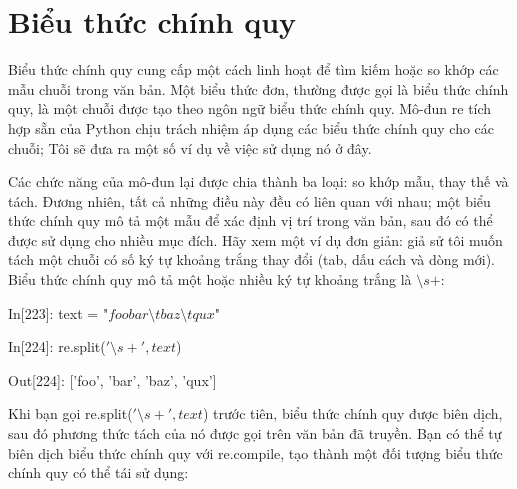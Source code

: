 \section{Biểu thức chính quy}
Biểu thức chính quy cung cấp một cách linh hoạt để tìm kiếm hoặc so khớp các mẫu chuỗi trong văn bản. Một biểu thức đơn, thường được gọi là biểu thức chính quy, là một chuỗi được tạo theo ngôn ngữ biểu thức chính quy. Mô-đun re tích hợp sẵn của Python chịu trách nhiệm áp dụng các biểu thức chính quy cho các chuỗi; Tôi sẽ đưa ra một số ví dụ về việc sử dụng nó ở đây.\par
Các chức năng của mô-đun lại được chia thành ba loại: so khớp mẫu, thay thế và tách. Đương nhiên, tất cả những điều này đều có liên quan với nhau; một biểu thức chính quy mô tả một mẫu để xác định vị trí trong văn bản, sau đó có thể được sử dụng cho nhiều mục đích. Hãy xem một ví dụ đơn giản: giả sử tôi muốn tách một chuỗi có số ký tự khoảng trắng thay đổi (tab, dấu cách và dòng mới). Biểu thức chính quy mô tả một hoặc nhiều ký tự khoảng trắng là $\setminus s+:$\par
\hspace{1cm}In\hspace{3mm}[223]:\hspace{3mm} text = "$foo bar\setminus t baz \setminus tqux$" \par
\hspace{1cm}In\hspace{3mm}[224]:\hspace{3mm} re.split($'\setminus s+', text$)\par
\hspace{1cm}Out[224]:\hspace{3mm} ['foo', 'bar', 'baz', 'qux'] \par

Khi bạn gọi re.split($'\setminus s+', text$) trước tiên, biểu thức chính quy được biên dịch, sau đó phương thức tách của nó được gọi trên văn bản đã truyền. Bạn có thể tự biên dịch biểu thức chính quy với re.compile, tạo thành một đối tượng biểu thức chính quy có thể tái sử dụng:\par

